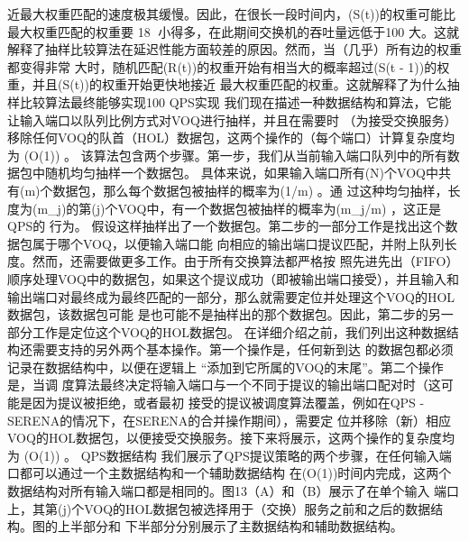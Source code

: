 近最大权重匹配的速度极其缓慢。因此，在很长一段时间内，(S(t))的权重可能比最大权重匹配的权重要
                                                             18
小得多，在此期间交换机的吞吐量远低于100%
大。这就解释了抽样比较算法在延迟性能方面较差的原因。然而，当（几乎）所有边的权重都变得非常
大时，随机匹配(R(t))的权重开始有相当大的概率超过(S(t - 1))的权重，并且(S(t))的权重开始更快地接近
最大权重匹配的权重。这就解释了为什么抽样比较算法最终能够实现100%
QPS实现
我们现在描述一种数据结构和算法，它能让输入端口以队列比例方式对VOQ进行抽样，并且在需要时
（为接受交换服务）移除任何VOQ的队首（HOL）数据包，这两个操作的（每个端口）计算复杂度均为
(O(1)) 。
该算法包含两个步骤。第一步，我们从当前输入端口队列中的所有数据包中随机均匀抽样一个数据包。
具体来说，如果输入端口所有(N)个VOQ中共有(m)个数据包，那么每个数据包被抽样的概率为(1/m) 。通
过这种均匀抽样，长度为(m_j)的第(j)个VOQ中，有一个数据包被抽样的概率为(m_j/m) ，这正是QPS的
行为。
假设这样抽样出了一个数据包。第二步的一部分工作是找出这个数据包属于哪个VOQ，以便输入端口能
向相应的输出端口提议匹配，并附上队列长度。然而，还需要做更多工作。由于所有交换算法都严格按
照先进先出（FIFO）顺序处理VOQ中的数据包，如果这个提议成功（即被输出端口接受），并且输入和
输出端口对最终成为最终匹配的一部分，那么就需要定位并处理这个VOQ的HOL数据包，该数据包可能
是也可能不是抽样出的那个数据包。因此，第二步的另一部分工作是定位这个VOQ的HOL数据包。
在详细介绍之前，我们列出这种数据结构还需要支持的另外两个基本操作。第一个操作是，任何新到达
的数据包都必须记录在数据结构中，以便在逻辑上 “添加到它所属的VOQ的末尾”。第二个操作是，当调
度算法最终决定将输入端口与一个不同于提议的输出端口配对时（这可能是因为提议被拒绝，或者最初
接受的提议被调度算法覆盖，例如在QPS - SERENA的情况下，在SERENA的合并操作期间），需要定
位并移除（新）相应VOQ的HOL数据包，以便接受交换服务。接下来将展示，这两个操作的复杂度均为
(O(1)) 。
QPS数据结构
我们展示了QPS提议策略的两个步骤，在任何输入端口都可以通过一个主数据结构和一个辅助数据结构
在(O(1))时间内完成，这两个数据结构对所有输入端口都是相同的。图13（A）和（B）展示了在单个输入
端口上，其第(j)个VOQ的HOL数据包被选择用于（交换）服务之前和之后的数据结构。图的上半部分和
下半部分分别展示了主数据结构和辅助数据结构。




